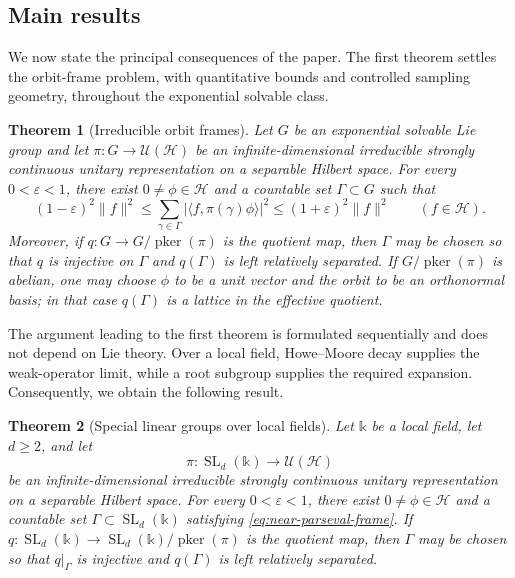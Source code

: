 \documentclass[10pt,a4paper]{amsart}
\numberwithin{equation}{section}
\newtheorem{theorem}{Theorem}[section]
\newcommand{\cH}{\mathcal H}
\newcommand{\U}{\mathcal U}
\newcommand{\pker}{\operatorname{pker}}
\begin{document}
\subsection{Main results}

We now state the principal consequences of the paper.  The first theorem
settles the orbit-frame problem, with quantitative bounds and controlled
sampling geometry, throughout the exponential solvable class.


\begin{theorem}[Irreducible orbit frames]\label{thm:main}
Let $G$ be an exponential solvable Lie group and let
$\pi:G\to\U(\cH)$ be an infinite-dimensional irreducible strongly continuous
unitary representation on a separable Hilbert space.  For every
$0<\varepsilon<1$,
there exist $0\neq\phi\in\cH$ and a countable set $\Gamma\subset G$ such
that
\begin{equation}\label{eq:near-parseval-frame}
 (1-\varepsilon)^2\|f\|^2
 \leq \sum_{\gamma\in\Gamma}
       |\langle f,\pi(\gamma)\phi\rangle|^2
 \leq (1+\varepsilon)^2\|f\|^2
 \qquad(f\in\cH).
\end{equation}
Moreover, if $q:G\to G/\pker(\pi)$ is the quotient map, then $\Gamma$
may be chosen so that $q$ is injective on $\Gamma$ and $q(\Gamma)$ is left
relatively separated.  If $G/\pker(\pi)$ is abelian, one may choose $\phi$ to be a
unit vector and the orbit to be an orthonormal basis; in that case
$q(\Gamma)$ is
a lattice in the effective quotient.
\end{theorem}


The argument leading to the first theorem is formulated sequentially and does
not depend on Lie theory.  Over a local field, Howe--Moore decay supplies the
weak-operator limit, while a root subgroup supplies the required expansion.
Consequently, we obtain the following result.

\begin{theorem}[Special linear groups over local fields]
\label{thm:local-field-main}
Let $\mathbb k$ be a local field, let $d\geq2$, and let
\[
 \pi:\operatorname{SL}_d(\mathbb k)\longrightarrow\U(\cH)
\]
be an infinite-dimensional irreducible strongly continuous unitary
representation on a separable Hilbert space.  For every
$0<\varepsilon<1$, there exist $0\neq\phi\in\cH$ and a countable set
$\Gamma\subset\operatorname{SL}_d(\mathbb k)$ satisfying
\eqref{eq:near-parseval-frame}.  If
$q:\operatorname{SL}_d(\mathbb k)\to
\operatorname{SL}_d(\mathbb k)/\pker(\pi)$ is the quotient map, then
$\Gamma$ may be chosen so that $q|_\Gamma$ is injective and $q(\Gamma)$ is
left relatively separated.
\end{theorem}
\end{document}
